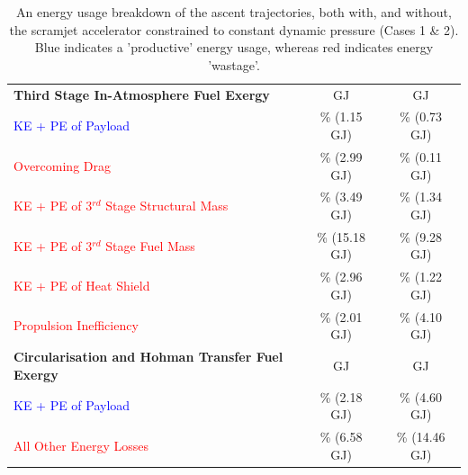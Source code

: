 \begin{table}[ht]
\begin{tabular}{l c c}
		\textbf{Third Stage In-Atmosphere Fuel Exergy}  
		& \textbf{\thirdEnergyConstqNoReturn}  GJ & \textbf{\thirdEnergyStandardNoReturn}  GJ
		\\
		\textcolor{blue}{KE + PE of Payload}  
		&\thirddExergyEffAtmConstqNoReturn \% (1.15 GJ) &\thirddExergyEffAtmStandardNoReturn \% (0.73 GJ)
		\\
		\textcolor{red}{Overcoming Drag}  
		& \WDthreeConstqNoReturn \% (2.99 GJ) & \WDthreeStandardNoReturn \% (0.11 GJ)
		\\
		\textcolor{red}{KE + PE  of 3$^{rd}$ Stage Structural Mass}  
		& \WthreeConstqNoReturn \% (3.49 GJ) & \WthreeStandardNoReturn \% (1.34 GJ)
		\\
	
		\textcolor{red}{KE + PE  of 3$^{rd}$ Stage Fuel Mass}  
		& \WmFthreeConstqNoReturn \% (15.18 GJ) & \WmFthreeStandardNoReturn \% (9.28 GJ)
		\\
		\textcolor{red}{KE + PE of Heat Shield}  
		& \WHSthreeConstqNoReturn \% (2.96 GJ) & \WHSthreeStandardNoReturn \% (1.22 GJ)
		\\
		\textcolor{red}{Propulsion Inefficiency}  
		& \PlossthreeConstqNoReturn \% (2.01 GJ) & \PlossthreeStandardNoReturn \% (4.10 GJ)
		\\
		\textbf{Circularisation and Hohman Transfer Fuel Exergy}  
		& \textbf{\HTExergyConstqNoReturn}  GJ & \textbf{\HTExergyStandardNoReturn}  GJ
		\\
		\textcolor{blue}{KE + PE of Payload}  
		& \HTeffConstqNoReturn \% (2.18 GJ) & \HTeffStandardNoReturn \% (4.60 GJ)
		\\
		\textcolor{red}{All Other Energy Losses}  
		& \HTlossConstqNoReturn \% (6.58 GJ) & \HTlossStandardNoReturn \% (14.46 GJ)
		\\
		\hline 
	\end{tabular} 
	\caption{An energy usage breakdown of the ascent trajectories, both with, and without, the scramjet accelerator constrained to constant dynamic pressure (Cases 1 \& 2). Blue indicates a 'productive' energy usage, whereas red indicates energy 'wastage'.}
	\label{tab:effStandardNoReturn}
\end{table}



